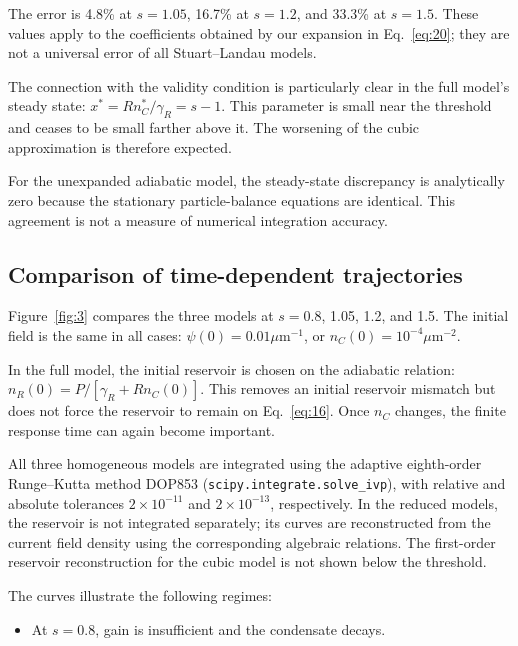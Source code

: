\documentclass[12pt,a4paper]{article}
\begin{document}
The error is 4.8\% at $s=1.05$, 16.7\% at $s=1.2$, and 33.3\% at $s=1.5$. These values apply to the coefficients obtained by our expansion in Eq.~\eqref{eq:20}; they are not a universal error of all Stuart--Landau models.

The connection with the validity condition is particularly clear in the full model's steady state: $x^{*}=R n_{C}^{*}/\gamma_{R}=s-1$. This parameter is small near the threshold and ceases to be small farther above it. The worsening of the cubic approximation is therefore expected.

For the unexpanded adiabatic model, the steady-state discrepancy is analytically zero because the stationary particle-balance equations are identical. This agreement is not a measure of numerical integration accuracy.

\subsection{Comparison of time-dependent trajectories}\label{sec:4.5}

Figure~\ref{fig:3} compares the three models at $s=0.8$, 1.05, 1.2, and 1.5. The initial field is the same in all cases: $\psi(0)=0.01 \mu\mathrm m^{-1}$, or $n_{C}(0)=10^{-4} \mu\mathrm m^{-2}$.

In the full model, the initial reservoir is chosen on the adiabatic relation: $n_{R}(0)=P/[\gamma_{R}+R n_{C}(0)]$. This removes an initial reservoir mismatch but does not force the reservoir to remain on Eq.~\eqref{eq:16}. Once $n_{C}$ changes, the finite response time can again become important.

All three homogeneous models are integrated using the adaptive eighth-order Runge--Kutta method DOP853 (\texttt{scipy.integrate.solve\_ivp}), with relative and absolute tolerances $2\times10^{-11}$ and $2\times10^{-13}$, respectively. In the reduced models, the reservoir is not integrated separately; its curves are reconstructed from the current field density using the corresponding algebraic relations. The first-order reservoir reconstruction for the cubic model is not shown below the threshold.

The curves illustrate the following regimes:

\begin{itemize}\setlength{\itemsep}{3pt}\item At $s=0.8$, gain is insufficient and the condensate decays.\end{itemize}
\end{document}
